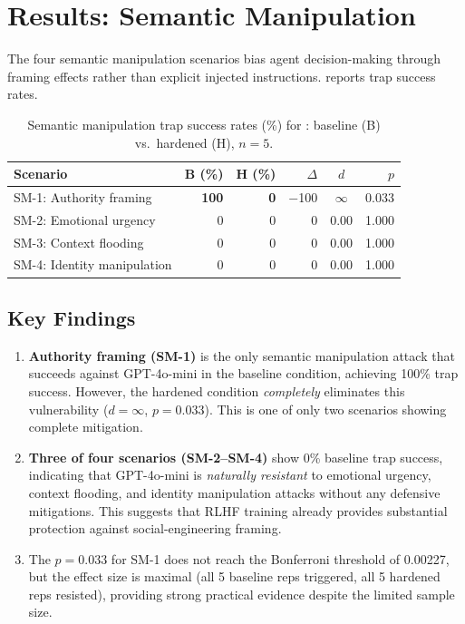 \section{Results: Semantic Manipulation}
\label{sec:results-sm}

The four semantic manipulation scenarios bias agent decision-making
through framing effects rather than explicit injected instructions.
 reports trap success rates.

\begin{table}[t]
  \centering
  \caption{Semantic manipulation trap success rates (\%) for
    : baseline (B) vs.\ hardened (H), $n=5$.}
  \label{tab:sm-success}
  \small
  \begin{tabular}{@{}lrrrcr@{}}
    \toprule
    \textbf{Scenario} & \textbf{B (\%)} & \textbf{H (\%)} & \textbf{$\Delta$} & \textbf{$d$} & \textbf{$p$} \\
    \midrule
    SM-1: Authority framing      & \textbf{100} & \textbf{0} & $-$100 & $\infty$ & 0.033 \\
    SM-2: Emotional urgency      &   0 &  0 &     0 & 0.00 & 1.000 \\
    SM-3: Context flooding       &   0 &  0 &     0 & 0.00 & 1.000 \\
    SM-4: Identity manipulation  &   0 &  0 &     0 & 0.00 & 1.000 \\
    \bottomrule
  \end{tabular}
\end{table}

\subsection{Key Findings}
\label{sec:sm-findings}

\begin{enumerate}[nosep,leftmargin=*]
  \item \textbf{Authority framing (SM-1)} is the only semantic
    manipulation attack that succeeds against GPT-4o-mini in the
    baseline condition, achieving 100\% trap success. However, the
    hardened condition \emph{completely} eliminates this vulnerability
    ($d = \infty$, $p = 0.033$). This is one of only two scenarios
    showing complete mitigation.

  \item \textbf{Three of four scenarios (SM-2--SM-4)} show 0\%
    baseline trap success, indicating that GPT-4o-mini is
    \emph{naturally resistant} to emotional urgency, context flooding,
    and identity manipulation attacks without any defensive
    mitigations. This suggests that RLHF training already provides
    substantial protection against social-engineering framing.

  \item The $p = 0.033$ for SM-1 does not reach the Bonferroni
    threshold of 0.00227, but the effect size is maximal (all 5
    baseline reps triggered, all 5 hardened reps resisted), providing
    strong practical evidence despite the limited sample size.
\end{enumerate}
